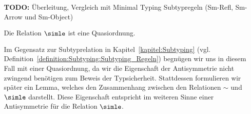 {\bf TODO:} \"Uberleitung, Vergleich mit Minimal Typing Subtypregeln (Sm-Refl, Sm-Arrow und Sm-Object)

\begin{lemma} \label{lemma:Losrt:Quasiordnung}
  Die Relation $\simle$ ist eine Quasiordnung.
\end{lemma}
%
Im Gegensatz zur Subtyprelation in Kapitel~\ref{kapitel:Subtyping} (vgl. Definition~\ref{definition:Subtyping:Subtyping_Regeln})
begn\"ugen wir uns in diesem Fall mit einer Quasiordnung, da wir die Eigenschaft der Antisymmetrie nicht zwingend ben\"otigen
zum Beweis der Typsicherheit. Stattdessen formulieren wir sp\"ater ein Lemma, welches den Zusammenhang zwischen den Relationen
$\sim$ und $\simle$ darstellt. Diese Eigenschaft entspricht im weiteren Sinne einer Antisymmetrie f\"ur die Relation
$\simle$.

